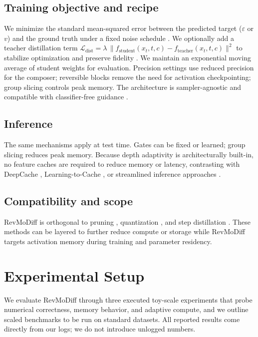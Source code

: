 \documentclass{article}
\begin{document}
\subsection{Training objective and recipe}
We minimize the standard mean-squared error between the predicted target ($\varepsilon$ or $v$) and the ground truth under a fixed noise schedule \cite{dhariwal-2021-diffusion,karras-2022-elucidating}. We optionally add a teacher distillation term $\mathcal{L}_{\mathrm{dist}} = \lambda \, \lVert f_{\mathrm{student}}(x_t, t, c) - f_{\mathrm{teacher}}(x_t, t, c) \rVert^2$ to stabilize optimization and preserve fidelity \cite{salimans-2024-multistep}. We maintain an exponential moving average of student weights for evaluation. Precision settings use reduced precision for the composer; reversible blocks remove the need for activation checkpointing; group slicing controls peak memory. The architecture is sampler-agnostic and compatible with classifier-free guidance \cite{dhariwal-2021-diffusion}.

\subsection{Inference}
The same mechanisms apply at test time. Gates can be fixed or learned; group slicing reduces peak memory. Because depth adaptivity is architecturally built-in, no feature caches are required to reduce memory or latency, contrasting with DeepCache \cite{ma-2023-deepcache}, Learning-to-Cache \cite{ma-2024-learning}, or streamlined inference approaches \cite{zhan-2024-fast}.

\subsection{Compatibility and scope}
RevMoDiff is orthogonal to pruning \cite{fang-2023-structural,zhu-2024-dip}, quantization \cite{so-2023-temporal}, and step distillation \cite{salimans-2024-multistep,hsiao-2024-plug}. These methods can be layered to further reduce compute or storage while RevMoDiff targets activation memory during training and parameter residency.

\section{Experimental Setup}
We evaluate RevMoDiff through three executed toy-scale experiments that probe numerical correctness, memory behavior, and adaptive compute, and we outline scaled benchmarks to be run on standard datasets. All reported results come directly from our logs; we do not introduce unlogged numbers.
\end{document}
